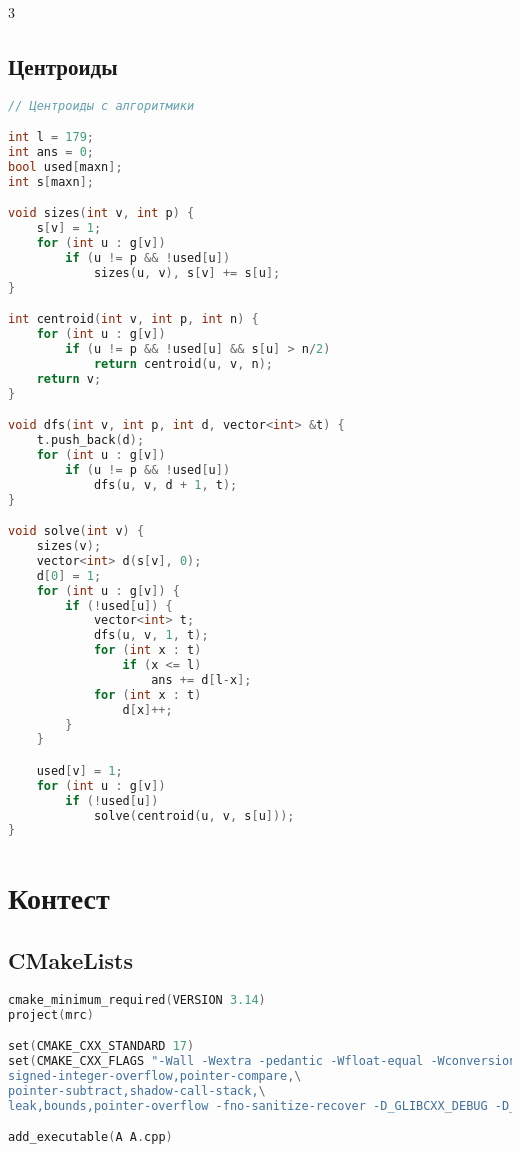 \documentclass[10pt,a4paper,landscape,twosided]{extarticle}
\begin{document}
\begin{multicols}{3}
\subsection{Центроиды}
\begin{lstlisting}[language=C++]
// Центроиды с алгоритмики

int l = 179;
int ans = 0;
bool used[maxn];
int s[maxn];

void sizes(int v, int p) {
    s[v] = 1;
    for (int u : g[v])
        if (u != p && !used[u])
            sizes(u, v), s[v] += s[u];
}

int centroid(int v, int p, int n) {
    for (int u : g[v])
        if (u != p && !used[u] && s[u] > n/2)
            return centroid(u, v, n);
    return v;
}

void dfs(int v, int p, int d, vector<int> &t) {
    t.push_back(d);
    for (int u : g[v])
        if (u != p && !used[u])
            dfs(u, v, d + 1, t);
} 

void solve(int v) {
    sizes(v);
    vector<int> d(s[v], 0);
    d[0] = 1;
    for (int u : g[v]) {
        if (!used[u]) {
            vector<int> t;
            dfs(u, v, 1, t);
            for (int x : t)
                if (x <= l)
                    ans += d[l-x];
            for (int x : t)
                d[x]++;
        }
    }

    used[v] = 1;
    for (int u : g[v])
        if (!used[u])
            solve(centroid(u, v, s[u]));
}
\end{lstlisting}

\section{Контест}

\subsection{CMakeLists}
\begin{lstlisting}[language=C++]
cmake_minimum_required(VERSION 3.14)
project(mrc)

set(CMAKE_CXX_STANDARD 17)
set(CMAKE_CXX_FLAGS "-Wall -Wextra -pedantic -Wfloat-equal -Wconversion -Wlogical-op -Wshift-overflow=2 -fsanitize=address,undefined,\
signed-integer-overflow,pointer-compare,\
pointer-subtract,shadow-call-stack,\
leak,bounds,pointer-overflow -fno-sanitize-recover -D_GLIBCXX_DEBUG -D_GLIBCXX_DEBUG_PEDANTIC -DONPC")

add_executable(A A.cpp)
\end{lstlisting}


\end{multicols}
\end{document}
